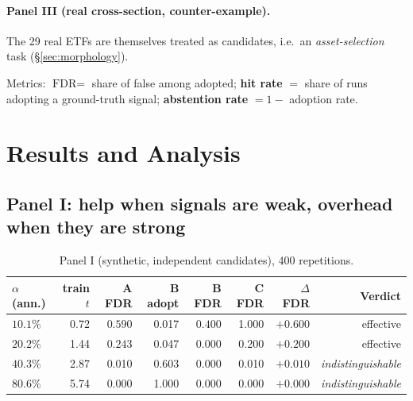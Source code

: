 \documentclass[11pt]{article}
\begin{document}
\paragraph{Panel III (real cross-section, counter-example).} The 29 real ETFs are themselves
treated as candidates, i.e.\ an \emph{asset-selection} task (\S\ref{sec:morphology}).

\noindent Metrics: $\text{FDR}=$ share of false among adopted; \textbf{hit rate} $=$ share of runs
adopting a ground-truth signal; \textbf{abstention rate} $=1-$ adoption rate.

\section{Results and Analysis}
\label{sec:results}

\subsection{Panel I: help when signals are weak, overhead when they are strong}

\begin{table}[htbp]
\centering
\caption{Panel I (synthetic, independent candidates), 400 repetitions.}
\label{tab:exp1}
\small
\begin{tabular}{@{}lrrrrrrr@{}}
\toprule
$\alpha$ (ann.) & train $t$ & \textbf{A FDR} & B adopt & \textbf{B FDR} & \textbf{C FDR} & $\Delta$FDR & Verdict \\
\midrule
$10.1\%$ & 0.72 & $\mathbf{0.590}$ & 0.017 & $\mathbf{0.400}$ & 1.000 & $\mathbf{+0.600}$ & effective \\
$20.2\%$ & 1.44 & $\mathbf{0.243}$ & 0.047 & $\mathbf{0.000}$ & 0.200 & $\mathbf{+0.200}$ & effective \\
$40.3\%$ & 2.87 & 0.010 & 0.603 & 0.000 & 0.010 & $+0.010$ & \emph{indistinguishable} \\
$80.6\%$ & 5.74 & 0.000 & 1.000 & 0.000 & 0.000 & $+0.000$ & \emph{indistinguishable} \\
\bottomrule
\end{tabular}
\end{table}
\end{document}
